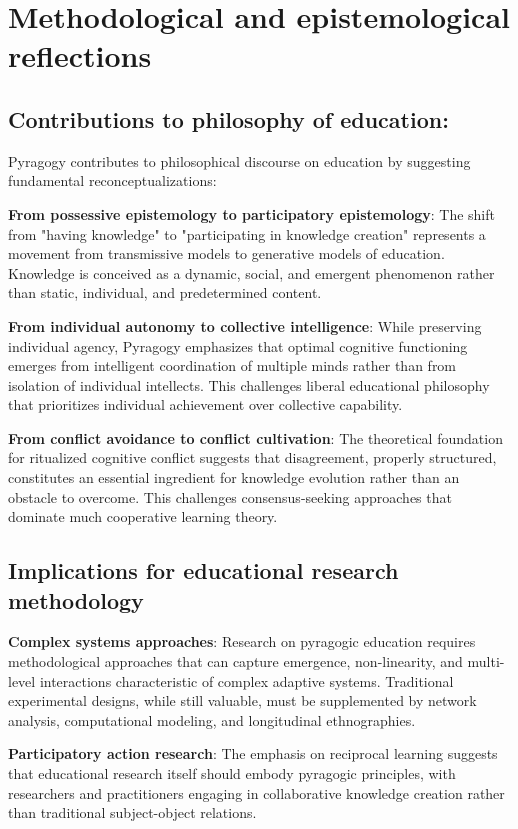 \section{Methodological and epistemological reflections}
\subsection*{Contributions to philosophy of education:}

Pyragogy contributes to philosophical discourse on education by suggesting fundamental reconceptualizations:

\textbf{From possessive epistemology to participatory epistemology}:
The shift from "having knowledge" to "participating in knowledge creation" represents a movement from transmissive models to generative models of education. Knowledge is conceived as a dynamic, social, and emergent phenomenon rather than static, individual, and predetermined content.

\textbf{From individual autonomy to collective intelligence}:
While preserving individual agency, Pyragogy emphasizes that optimal cognitive functioning emerges from intelligent coordination of multiple minds rather than from isolation of individual intellects. This challenges liberal educational philosophy that prioritizes individual achievement over collective capability.

\textbf{From conflict avoidance to conflict cultivation}:
The theoretical foundation for ritualized cognitive conflict suggests that disagreement, properly structured, constitutes an essential ingredient for knowledge evolution rather than an obstacle to overcome. This challenges consensus-seeking approaches that dominate much cooperative learning theory.

\subsection{Implications for educational research methodology}

\textbf{Complex systems approaches}:
Research on pyragogic education requires methodological approaches that can capture emergence, non-linearity, and multi-level interactions characteristic of complex adaptive systems. Traditional experimental designs, while still valuable, must be supplemented by network analysis, computational modeling, and longitudinal ethnographies.

\textbf{Participatory action research}:
The emphasis on reciprocal learning suggests that educational research itself should embody pyragogic principles, with researchers and practitioners engaging in collaborative knowledge creation rather than traditional subject-object relations.

